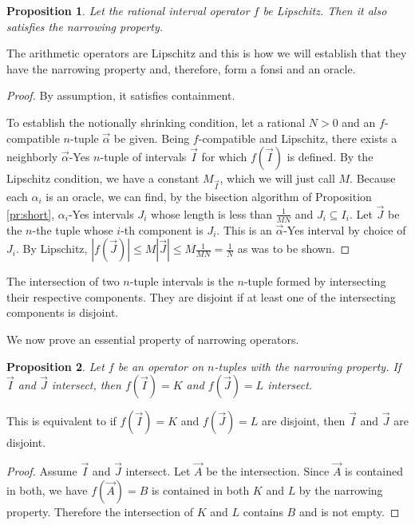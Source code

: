 \documentclass[12pt]{article}
\newtheorem{proposition}{Proposition}[subsection]
\begin{document}
\begin{proposition}
    Let the rational interval operator $f$ be Lipschitz. Then it also satisfies the narrowing property. 
\end{proposition}

The arithmetic operators are Lipschitz and this is how we will establish that they have the narrowing property and, therefore, form a fonsi and an oracle. 

\begin{proof}
    By assumption, it satisfies containment. 

    To establish the notionally shrinking condition, let a rational $N >0$ and an $f$-compatible  $n$-tuple $\vec{\alpha}$ be given. Being $f$-compatible and Lipschitz, there exists a neighborly $\vec{\alpha}$-Yes $n$-tuple of intervals $\vec{I}$ for which $f(\vec{I})$ is defined. By the Lipschitz condition, we have a constant $M_{\vec{I}}$, which we will just call $M$. Because each $\alpha_i$ is an oracle, we can find, by the bisection algorithm of Proposition \ref{pr:short}, $\alpha_i$-Yes intervals $J_i$ whose length is less than $\frac{1}{MN}$ and $J_i \subseteq I_i$. Let $\vec{J}$ be the $n$-the tuple whose $i$-th component is $J_i$. This is an $\vec{\alpha}$-Yes interval by choice of $J_i$. By Lipschitz, $|f(\vec{J})| \leq M |\vec{J}| \leq M \frac{1}{MN} = \frac{1}{N}$ as was to be shown. 
\end{proof}


The intersection of two $n$-tuple intervals is the $n$-tuple formed by intersecting their respective components. They are disjoint if at least one of the intersecting components is disjoint. 

We now prove an essential property of narrowing operators. 

\begin{proposition} \label{pr:op-nrw}
Let $f$ be an operator on $n$-tuples with the narrowing property. If $\vec{I}$ and $\vec{J}$ intersect, then $f(\vec{I})=K$ and $f(\vec{J}) = L$ intersect.
\end{proposition}

This is equivalent to if $f(\vec{I})=K$ and $f(\vec{J}) = L$ are disjoint, then $\vec{I}$ and $\vec{J}$ are disjoint.

\begin{proof}
Assume $\vec{I}$ and $\vec{J}$ intersect. Let $\vec{A}$ be the intersection. Since $\vec{A}$ is contained in both, we have $f(\vec A)= B$ is contained in both $K$ and $L$ by the narrowing property. Therefore the intersection of $K$ and $L$ contains $B$ and is not empty.  
\end{proof}
\end{document}
